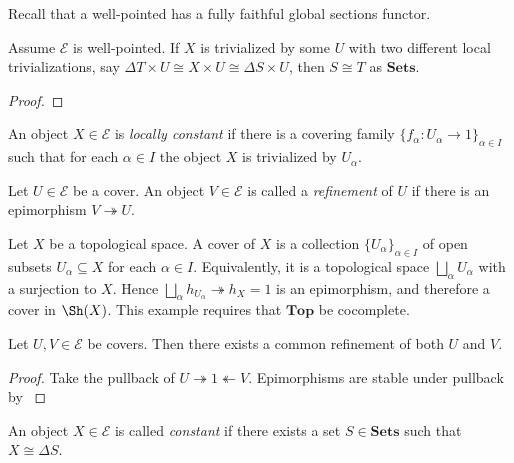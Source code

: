 Recall that a well-pointed has a fully faithful global sections functor.

\begin{lemma}
Assume $\mathscr{E}$ is well-pointed. If $X$ is trivialized by some $U$ with two different local trivializations, say $\Delta T \times U \cong X \times U \cong \Delta S \times U$, then $S \cong T$ as $\mathbf{Sets}$.
\end{lemma}
\begin{proof}

\end{proof}

\begin{definition}
An object $X \in \mathscr{E}$ is \emph{locally constant} if there is a covering family $\{f_{\alpha} :U_{\alpha} \to 1\}_{\alpha \in I}$ such that for each $\alpha \in I$ the object $X$ is trivialized by $U_{\alpha}$.
\end{definition}

\begin{definition}
Let $U \in \mathscr{E}$ be a cover. An object $V \in \mathscr{E}$ is called a \emph{refinement} of $U$ if there is an epimorphism $V \twoheadrightarrow U$.
\end{definition}

\begin{example}
Let $X$ be a topological space. A cover of $X$ is a collection $\{U_\alpha\}_{\alpha \in I}$ of open subsets $U_{\alpha} \subseteq X$ for each $\alpha \in I$. Equivalently, it is a topological space $\bigsqcup_{\alpha} U_\alpha$ with a surjection to $X$. Hence $\bigsqcup_{\alpha} h_{U_{\alpha}} \twoheadrightarrow h_X = 1$ is an epimorphism, and therefore a cover in $\Sh(X)$. This example requires that $\mathbf{Top}$ be cocomplete.
\end{example}

\begin{lemma}
\label{lemma: common refinement of covers exists}
Let $U,V \in \mathscr{E}$ be covers. Then there exists a common refinement of both $U$ and $V$.
\end{lemma}
\begin{proof}
Take the pullback of $U \twoheadrightarrow 1 \twoheadleftarrow V$. Epimorphisms are stable under pullback by \cite[Theorem VII.7.3]{MacLaneMoerdijk91}
\end{proof}

\begin{definition}
An object $X \in \mathscr{E}$ is called \emph{constant} if there exists a set $S \in \mathbf{Sets}$ such that $X \cong \Delta S$.
\end{definition}

